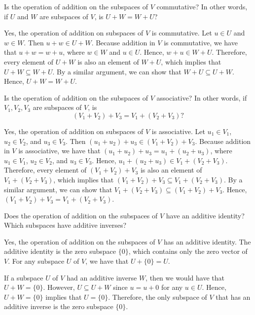 \begin{exc}
\begin{exercise}
Is the operation of addition on the subspaces of $V$ commutative? In other
words, if $U$ and $W$ are subspaces of $V$, is $U+W=W+U$?
\end{exercise}
\begin{solution}
Yes, the operation of addition on subspaces of $V$ is commutative. Let $u\in U$
and $w\in W$. Then $u+w\in U+W$. Because addition in $V$ is commutative, we
have that $u+w=w+u$, where $w\in W$ and $u\in U$. Hence, $w+u\in W+U$.
Therefore, every element of $U+W$ is also an element of $W+U$, which implies
that $U+W\subseteq W+U$. By a similar argument, we can show that
$W+U\subseteq U+W$. Hence, $U+W=W+U$.
\end{solution}

\begin{exercise}
Is the operation of addition on the subspaces of $V$ associative? In other
words, if $V_1,V_2,V_3$ are subspaces of $V$, is
\[ (V_1+V_2)+V_3 = V_1+(V_2+V_3)? \]
\end{exercise}
\begin{solution}
Yes, the operation of addition on subspaces of $V$ is associative. Let
$u_1\in V_1$, $u_2\in V_2$, and $u_3\in V_3$. Then
$(u_1+u_2)+u_3\in(V_1+V_2)+V_3$. Because addition in $V$ is associative, we
have that $(u_1+u_2)+u_3=u_1+(u_2+u_3)$, where $u_1\in V_1$, $u_2\in V_2$, and
$u_3\in V_3$. Hence, $u_1+(u_2+u_3)\in V_1+(V_2+V_3)$. Therefore, every element
of $(V_1+V_2)+V_3$ is also an element of $V_1+(V_2+V_3)$, which implies that
$(V_1+V_2)+V_3\subseteq V_1+(V_2+V_3)$. By a similar argument, we can show that
$V_1+(V_2+V_3)\subseteq(V_1+V_2)+V_3$. Hence, $(V_1+V_2)+V_3=V_1+(V_2+V_3)$.
\end{solution}

\begin{exercise}
Does the operation of addition on the subspaces of $V$ have an additive
identity? Which subspaces have additive inverses?
\end{exercise}
\begin{solution}
Yes, the operation of addition on the subspaces of $V$ has an additive
identity. The additive identity is the zero subspace $\{0\}$, which contains
only the zero vector of $V$. For any subspace $U$ of $V$, we have that
$U+\{0\}=U$.

If a subspace $U$ of $V$ had an additive inverse $W$, then we would have that
$U+W=\{0\}$. However, $U\subseteq U+W$ since $u=u+0$ for any $u\in U$. Hence,
$U+W=\{0\}$ implies that $U=\{0\}$. Therefore, the only subspace of $V$ that has
an additive inverse is the zero subspace $\{0\}$.
\end{solution}


\end{exc}
